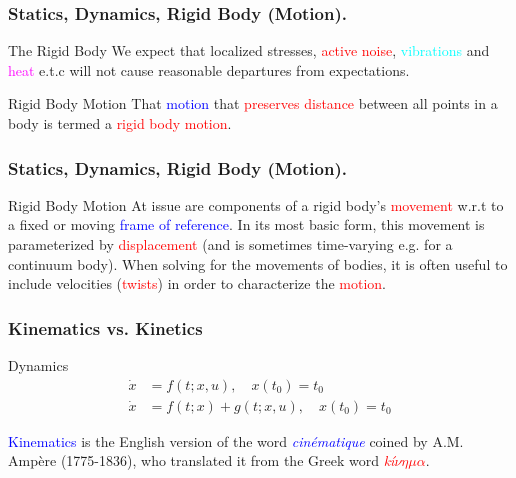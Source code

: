 \begin{frame}
	\frametitle{Statics, Dynamics, Rigid Body (Motion).}
	\begin{block}{The Rigid Body}
		We expect that \textcolor{light-blue}{localized stresses}, \textcolor{red}{active noise},  \textcolor{cyan}{vibrations} and \textcolor{magenta}{heat} e.t.c will not cause \textcolor{light-red}{reasonable departures} from expectations.
	\end{block}
	\begin{block}{Rigid Body Motion}
		That \textcolor{blue}{motion} that \textcolor{red}{preserves distance} between all points in a body is termed a \textcolor{red}{rigid body motion}.
	\end{block}
\end{frame}

\begin{frame}
	\frametitle{Statics, Dynamics, Rigid Body (Motion).}
	\begin{block}{Rigid Body Motion}
		At issue are components of a rigid body's \textcolor{red}{movement} w.r.t to a fixed or moving \textcolor{blue}{frame of reference}. In its most basic form, this movement is parameterized by \textcolor{red}{displacement} (and is sometimes time-varying e.g. for a continuum body). When solving for the movements of bodies, it is often useful to include velocities (\textcolor{red}{twists}) in order to characterize the \textcolor{red}{motion}.
	\end{block}
\end{frame}


\begin{frame}
	\frametitle{Kinematics vs. Kinetics}
	\begin{block}{Dynamics}
		\begin{align}
			\dot{x} &= f(t; x, u),  \quad x(t_0) = t_0 \\
			\dot{x} &= f(t; x)  + g(t; x, u),  \quad x(t_0) = t_0 
		\end{align}
	\end{block}
	\begin{definition}[Kinematics.] \textcolor{blue}{{Kinematics}} is the English version of the word  \textcolor{blue}{\textit{cin{\'e}matique}} coined by A.M. Amp{\`e}re (1775-1836), who translated it from the Greek word \textcolor{red}{\textit{k{\'i}$\nu \eta \mu \alpha$}}.
	\end{definition}
\end{frame}

